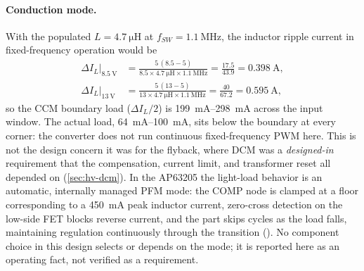 \paragraph{Conduction mode.} With the populated $L = \SI{4.7}{\micro\henry}$ at
$f_{SW} = \SI{1.1}{\mega\hertz}$, the inductor ripple current in fixed-frequency
operation would be
\begin{align*}
  \Delta I_L \big|_{\SI{8.5}{\volt}} &=
    \frac{5\,(8.5-5)}{8.5 \times \SI{4.7}{\micro\henry} \times \SI{1.1}{\mega\hertz}}
    = \frac{17.5}{43.9} = \SI{0.398}{\ampere}, \\
  \Delta I_L \big|_{\SI{13}{\volt}} &=
    \frac{5\,(13-5)}{13 \times \SI{4.7}{\micro\henry} \times \SI{1.1}{\mega\hertz}}
    = \frac{40}{67.2} = \SI{0.595}{\ampere},
\end{align*}
so the CCM boundary load ($\Delta I_L/2$) is \SIrange{199}{298}{\milli\ampere} across the
input window. The actual load, \SIrange{64}{100}{\milli\ampere}, sits below the boundary
at every corner: the converter does not run continuous fixed-frequency PWM here. This is
not the design concern it was for the flyback, where DCM was a \emph{designed-in}
requirement that the compensation, current limit, and transformer reset all depended on
(\cref{sec:hv-dcm}). In the AP63205 the light-load behavior is an automatic, internally
managed PFM mode: the COMP node is clamped at a floor corresponding to a
\SI{450}{\milli\ampere} peak inductor current, zero-cross detection on the low-side FET
blocks reverse current, and the part skips cycles as the load falls, maintaining
regulation continuously through the transition (). No component
choice in this design selects or depends on the mode; it is reported here as an operating
fact, not verified as a requirement.

